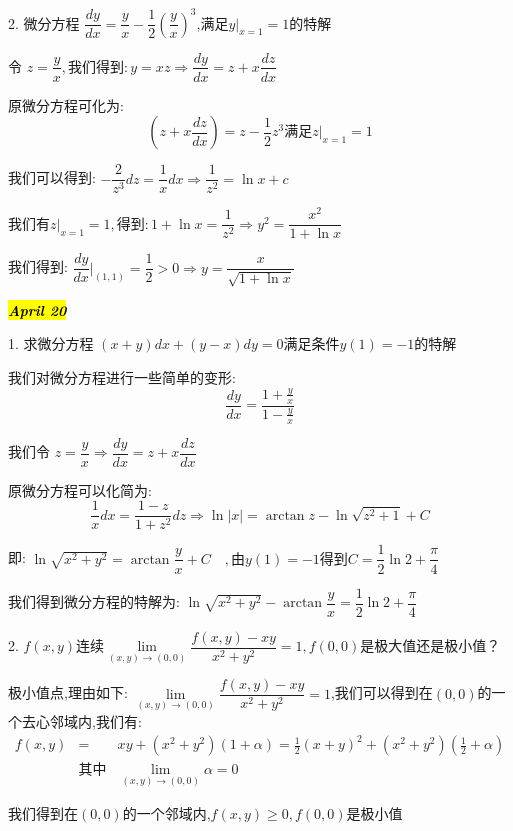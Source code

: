 2. 微分方程 $\dfrac{dy}{dx}=\dfrac{y}{x}-\dfrac{1}{2}(\dfrac{y}{x})^3$,满足$y|_{x=1}=1$的特解
\begin{solution}
	
	令 $z=\dfrac{y}{x},\text{我们得到}: y=xz\Rightarrow \dfrac{dy}{dx}=z+x\dfrac{dz}{dx}$
	
	原微分方程可化为: 
	$$(z+x\frac{dz}{dx})=z-\frac{1}{2}z^3\text{满足} z| _{x=1}=1$$
	
	我们可以得到: $-\dfrac{2}{z^3}dz=\dfrac{1}{x}dx\Rightarrow \dfrac{1}{z^2}=\ln x+c$
	
	$\text{我们有}z| _{x=1}=1,\text{得到}: 1+\ln x=\dfrac{1}{z^2}\Rightarrow y^2=\dfrac{x^2}{1+\ln x}$
	
	我们得到: $\dfrac{dy}{dx}|_{(1,1)}=\dfrac{1}{2}>0\Rightarrow y=\dfrac{x}{\sqrt{1+\ln x}}$
\end{solution}

\hl{\textbf{\textit{April 20}}}

1. 求微分方程 $(x+y)dx+(y-x)dy=0\text{满足条件}y(1)=-1\text{的特解}$
\begin{solution}
	
	我们对微分方程进行一些简单的变形: 
	$$\frac{dy}{dx}=\dfrac{1+\frac{y}{x}}{1-\frac{y}{x}}$$
	
	我们令 $z=\dfrac{y}{x}\Rightarrow \dfrac{dy}{dx}=z+x\dfrac{dz}{dx}$
	
	原微分方程可以化简为: 
	$$\frac{1}{x}dx=\frac{1-z}{1+z^2}dz\Rightarrow \ln |x|=\arctan z-\ln \sqrt{z^2+1}+C$$
	
	即: $\ln\sqrt{x^2+y^2}=\arctan \dfrac{y}{x}+C\quad ,\text{由}y(1)=-1\text{得到} C=\dfrac{1}{2}\ln 2+\dfrac{\pi}{4}$
	
	我们得到微分方程的特解为: $\ln\sqrt{x^2+y^2}-\arctan \dfrac{y}{x}=\dfrac{1}{2}\ln 2+\dfrac{\pi}{4}$
\end{solution}

2. $f(x,y)\text{连续}\lim\limits_{(x,y)\rightarrow (0,0)}\dfrac{f(x,y)-xy}{x^2+y^2}=1,f(0,0)\text{是极大值还是极小值？}$ 
\begin{solution}
	
	极小值点,理由如下: 
	$\lim\limits_{(x,y)\rightarrow (0,0)}\dfrac{f(x,y)-xy}{x^2+y^2}=1$,我们可以得到在$(0,0)$的一个去心邻域内,我们有: 
	\begin{eqnarray*}
		f(x,y)&=&xy+(x^2+y^2)(1+\alpha)=\frac{1}{2}(x+y)^2+(x^2+y^2)(\frac{1}{2}+\alpha)\\
		&\text{其中}&\lim\limits_{(x,y)\rightarrow (0,0)}\alpha=0
	\end{eqnarray*}

	我们得到在$(0,0)$的一个邻域内,$f(x,y)\geq 0,f(0,0)\text{是极小值}$
\end{solution}

